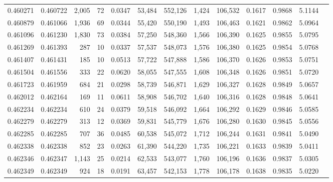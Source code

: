 \begin{tabular}{rrrrrrrrrrrrr}
0.460271 & 0.460722 & 2,005 &    72 &                                     0.0347 &  53,484 & 552,126 &   1,424 & 106,532 & 0.1617 & 0.9868 & 5.1144 \\
0.460879 & 0.461066 & 1,936 &    69 &                                     0.0344 &  55,420 & 550,190 &   1,493 & 106,463 & 0.1621 & 0.9862 & 5.0964 \\
0.461096 & 0.461230 & 1,830 &    73 &                                     0.0384 &  57,250 & 548,360 &   1,566 & 106,390 & 0.1625 & 0.9855 & 5.0795 \\
0.461269 & 0.461393 &   287 &    10 &                                     0.0337 &  57,537 & 548,073 &   1,576 & 106,380 & 0.1625 & 0.9854 & 5.0768 \\
0.461407 & 0.461431 &   185 &    10 &                                     0.0513 &  57,722 & 547,888 &   1,586 & 106,370 & 0.1626 & 0.9853 & 5.0751 \\
0.461504 & 0.461556 &   333 &    22 &                                     0.0620 &  58,055 & 547,555 &   1,608 & 106,348 & 0.1626 & 0.9851 & 5.0720 \\
0.461723 & 0.461959 &   684 &    21 &                                     0.0298 &  58,739 & 546,871 &   1,629 & 106,327 & 0.1628 & 0.9849 & 5.0657 \\
0.462012 & 0.462164 &   169 &    11 &                                     0.0611 &  58,908 & 546,702 &   1,640 & 106,316 & 0.1628 & 0.9848 & 5.0641 \\
0.462234 & 0.462234 &   610 &    24 &                                     0.0379 &  59,518 & 546,092 &   1,664 & 106,292 & 0.1629 & 0.9846 & 5.0585 \\
0.462279 & 0.462279 &   313 &    12 &                                     0.0369 &  59,831 & 545,779 &   1,676 & 106,280 & 0.1630 & 0.9845 & 5.0556 \\
0.462285 & 0.462285 &   707 &    36 &                                     0.0485 &  60,538 & 545,072 &   1,712 & 106,244 & 0.1631 & 0.9841 & 5.0490 \\
0.462338 & 0.462338 &   852 &    23 &                                     0.0263 &  61,390 & 544,220 &   1,735 & 106,221 & 0.1633 & 0.9839 & 5.0411 \\
0.462346 & 0.462347 & 1,143 &    25 &                                     0.0214 &  62,533 & 543,077 &   1,760 & 106,196 & 0.1636 & 0.9837 & 5.0305 \\
0.462349 & 0.462349 &   924 &    18 &                                     0.0191 &  63,457 & 542,153 &   1,778 & 106,178 & 0.1638 & 0.9835 & 5.0220 \\

\end{tabular}

